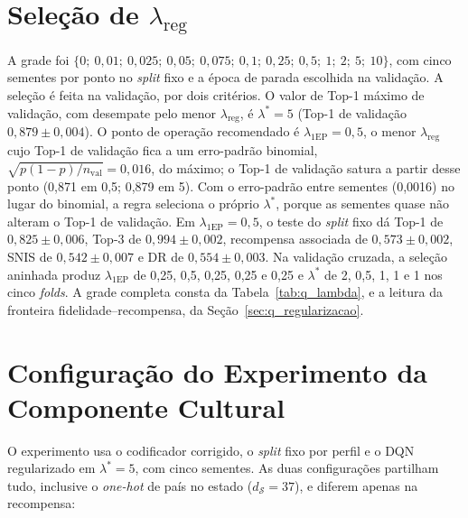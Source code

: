 \section*{Seleção de $\lambda_{\text{reg}}$}

A grade foi $\{0;\ 0{,}01;\ 0{,}025;\ 0{,}05;\ 0{,}075;\ 0{,}1;\ 0{,}25;\ 0{,}5;\ 1;\ 2;\ 5;\ 10\}$, com cinco sementes por ponto no \emph{split} fixo e a época de parada escolhida na validação. A seleção é feita na validação, por dois critérios. O valor de Top-1 máximo de validação, com desempate pelo menor $\lambda_{\text{reg}}$, é $\lambda^{*} = 5$ (Top-1 de validação $0{,}879 \pm 0{,}004$). O ponto de operação recomendado é $\lambda_{\text{1EP}} = 0{,}5$, o menor $\lambda_{\text{reg}}$ cujo Top-1 de validação fica a um erro-padrão binomial, $\sqrt{p(1-p)/n_{\text{val}}} = 0{,}016$, do máximo; o Top-1 de validação satura a partir desse ponto (0,871 em 0,5; 0,879 em 5). Com o erro-padrão entre sementes (0,0016) no lugar do binomial, a regra seleciona o próprio $\lambda^{*}$, porque as sementes quase não alteram o Top-1 de validação. Em $\lambda_{\text{1EP}} = 0{,}5$, o teste do \emph{split} fixo dá Top-1 de $0{,}825 \pm 0{,}006$, Top-3 de $0{,}994 \pm 0{,}002$, recompensa associada de $0{,}573 \pm 0{,}002$, SNIS de $0{,}542 \pm 0{,}007$ e DR de $0{,}554 \pm 0{,}003$. Na validação cruzada, a seleção aninhada produz $\lambda_{\text{1EP}}$ de 0,25, 0,5, 0,25, 0,25 e 0,25 e $\lambda^{*}$ de 2, 0,5, 1, 1 e 1 nos cinco \emph{folds}. A grade completa consta da Tabela~\ref{tab:q_lambda}, e a leitura da fronteira fidelidade--recompensa, da Seção~\ref{sec:q_regularizacao}.

\section*{Configuração do Experimento da Componente Cultural}
\label{sec:apendice_cultural}

O experimento usa o codificador corrigido, o \emph{split} fixo por perfil e o DQN regularizado em $\lambda^{*} = 5$, com cinco sementes. As duas configurações partilham tudo, inclusive o \textit{one-hot} de país no estado ($d_{\mathcal{S}} = 37$), e diferem apenas na recompensa:

